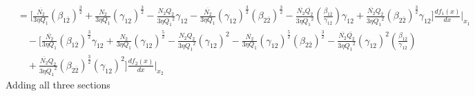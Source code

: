 \documentclass[fleqn, 10pt]{article}
\begin{document}
            \begin{equation}
            \begin{split}
            &= \Biggl[ \frac{\overline{N_2}}{3 \eta Q_1} (\beta_{1\overline{2}})^\frac{3}{2} + \frac{N_2}{3 \eta Q_1} (\gamma_{12})^\frac{3}{2} - \frac{N_2 Q_2}{3 \eta {Q_1}^2} \gamma_{12} - \frac{\overline{N_2}}{3 \eta Q_1} (\gamma_{12})^\frac{3}{2} (\beta_{2\overline{2}})^\frac{3}{2} - \frac{\overline{N_2} \overline{Q_2}}{3 \eta {Q_1}^2} \left(\frac{\beta_{1\overline{2}}}{\gamma_{12}}\right) \gamma_{12} + \frac{\overline{N_2} Q_2}{3 \eta {Q_1}^2} (\beta_{2 \overline{2}})^\frac{3}{2} \gamma_{12} \Biggr]   \frac{df_1(x)}{dx} \Bigg|_{x_1} \\ & \quad - \Biggl[ \frac{\overline{N_2}}{3 \eta Q_1} (\beta_{1\overline{2}})^\frac{3}{2} \gamma_{12} + \frac{N_2}{3 \eta Q_1} (\gamma_{12})^\frac{5}{2} - \frac{N_2 Q_2}{3 \eta {Q_1}^2} (\gamma_{12})^2 - \frac{\overline{N_2}}{3 \eta Q_1} (\gamma_{12})^\frac{5}{2} (\beta_{2\overline{2}})^\frac{3}{2} - \frac{\overline{N_2} \overline{Q_2}}{3 \eta {Q_1}^2} (\gamma_{12})^2 \left(\frac{\beta_{1\overline{2}}}{\gamma_{12}}\right) \\ & \quad +   \frac{\overline{N_2} Q_2}{3 \eta {Q_1}^2} (\beta_{2\overline{2}})^\frac{3}{2} (\gamma_{12})^2 \Biggr] \frac{df_2(x)}{dx} \Bigg|_{x_2}
            \end{split}
            \label{101}
            \end{equation}
            Adding all three sections 
\end{document}
